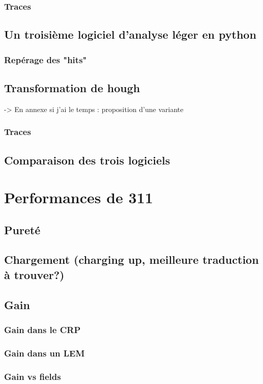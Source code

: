             \subsubsection{Traces}
        \subsection{Un troisième logiciel d'analyse léger en python}
            \subsubsection{Repérage des "hits"}
            \subsection{Transformation de hough}
                -> En annexe si j'ai le temps : proposition d'une variante
            \subsubsection{Traces}
        \subsection{Comparaison des trois logiciels}
        
    \section{Performances de 311}
        \subsection{Pureté}
        \subsection{Chargement (charging up, meilleure traduction à trouver?)}
        \subsection{Gain}
            \subsubsection{Gain dans le CRP}
            \subsubsection{Gain dans un LEM}
            \subsubsection{Gain vs fields}
